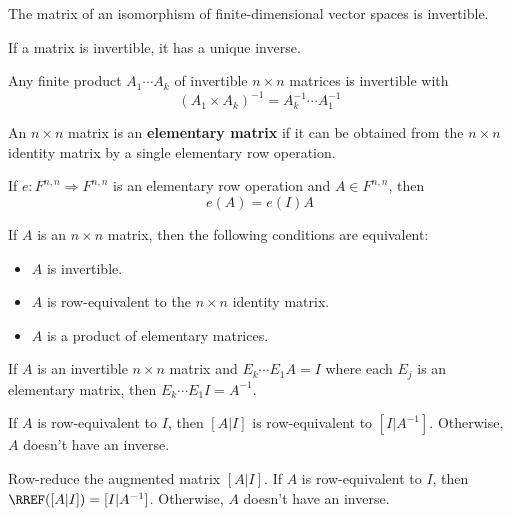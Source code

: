 \begin{lemma}
  The matrix of an isomorphism of finite-dimensional vector spaces is invertible.
\end{lemma}

\begin{lemma}
  If a matrix is invertible, it has a unique inverse.
\end{lemma}

\begin{lemma}
  Any finite product $A_1 \cdots A_k$ of invertible $n \times n$ matrices is invertible with
  \[
    (A_1 \times A_k)^{-1} = A_k^{-1} \cdots A_1^{-1}
  \]
\end{lemma}

\begin{definition}
  An $n \times n$ matrix is an \textbf{elementary matrix} if it can be obtained from the $n \times n$ identity matrix by a single elementary row operation.
\end{definition}

\begin{theorem}
  If $e : F^{n,n} \Rightarrow F^{n,n}$ is an elementary row operation and $A \in F^{n,n}$, then
  \[
    e(A) = e(I) A
  \]
\end{theorem}

\begin{namedtheorem}
  If $A$ is an $n \times n$ matrix, then the following conditions are equivalent:
  \begin{itemize}
    \item $A$ is invertible.
    \item $A$ is row-equivalent to the $n \times n$ identity matrix.
    \item $A$ is a product of elementary matrices.
  \end{itemize}
\end{namedtheorem}

\begin{theorem}
  If $A$ is an invertible $n \times n$ matrix and $E_k \cdots E_1 A = I$ where each $E_j$ is an elementary matrix, then $E_k \cdots E_1 I = A^{-1}$.
\end{theorem}

\begin{lemma}
  If $A$ is row-equivalent to $I$, then $[A | I]$ is row-equivalent to $[I | A^{-1}]$. Otherwise, $A$ doesn't have an inverse.
\end{lemma}

\begin{procedure}[Computation of $A^{-1}$]
  Row-reduce the augmented matrix $[A | I]$. If $A$ is row-equivalent to $I$, then $\RREF([A | I]) = [I | A^{-1}]$. Otherwise, $A$ doesn't have an inverse.
\end{procedure}


